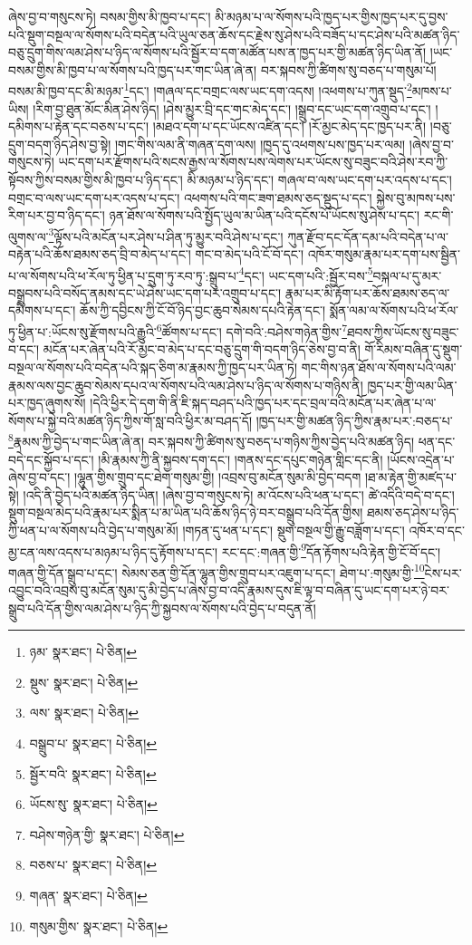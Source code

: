 ཞེས་བྱ་བ་གསུངས་ཏེ། བསམ་གྱིས་མི་ཁྱབ་པ་དང་། མི་མཉམ་པ་ལ་སོགས་པའི་ཁྱད་པར་གྱིས་ཁྱད་པར་དུ་བྱས་པའི་སྡུག་བསྔལ་ལ་སོགས་པའི་བདེན་པའི་ཡུལ་ཅན་ཆོས་དང་རྗེས་སུ་ཤེས་པའི་བཟོད་པ་དང་ཤེས་པའི་མཚན་ཉིད་བཅུ་དྲུག་གིས་ལམ་ཤེས་པ་ཉིད་ལ་སོགས་པའི་སྦྱོར་བ་དག་མཚོན་པས་ན་ཁྱད་པར་གྱི་མཚན་ཉིད་ཡིན་ནོ། །ཡང་བསམ་གྱིས་མི་ཁྱབ་པ་ལ་སོགས་པའི་ཁྱད་པར་གང་ཡིན་ཞེ་ན། བར་སྐབས་ཀྱི་ཚིགས་སུ་བཅད་པ་གསུམ་པོ། བསམ་མི་ཁྱབ་དང་མི་མཉམ་\footnote{ཉམ་  སྣར་ཐང་།  པེ་ཅིན། }དང་། །གཞལ་དང་བགྲང་ལས་ཡང་དག་འདས། །འཕགས་པ་ཀུན་སྡུད་\footnote{སྡུས་  སྣར་ཐང་།  པེ་ཅིན། }མཁས་པ་ཡིས། །རིག་བྱ་ཐུན་མོང་མིན་ཤེས་ཉིད། །ཤེས་མྱུར་བྲི་དང་གང་མེད་དང་། །སྒྲུབ་དང་ཡང་དག་འགྲུབ་པ་དང་། །དམིགས་པ་རྟེན་དང་བཅས་པ་དང་། །མཐའ་དག་པ་དང་ཡོངས་འཛིན་དང་། །རོ་མྱང་མེད་དང་ཁྱད་པར་ནི། །བཅུ་དྲུག་བདག་ཉིད་ཤེས་བྱ་སྟེ། །གང་གིས་ལམ་ནི་གཞན་དག་ལས། །ཁྱད་དུ་འཕགས་པས་ཁྱད་པར་ལམ། །ཞེས་བྱ་བ་གསུངས་ཏེ། ཡང་དག་པར་རྫོགས་པའི་སངས་རྒྱས་ལ་སོགས་པས་ལེགས་པར་ཡོངས་སུ་བཟུང་བའི་ཤེས་རབ་ཀྱི་སྟོབས་ཀྱིས་བསམ་གྱིས་མི་ཁྱབ་པ་ཉིད་དང་། མི་མཉམ་པ་ཉིད་དང་། གཞལ་བ་ལས་ཡང་དག་པར་འདས་པ་དང་། བགྲང་བ་ལས་ཡང་དག་པར་འདས་པ་དང་། འཕགས་པའི་གང་ཟག་ཐམས་ཅད་སྡུད་པ་དང་། སྐྱེས་བུ་མཁས་པས་རིག་པར་བྱ་བ་ཉིད་དང་། ཉན་ཐོས་ལ་སོགས་པའི་སྤྱོད་ཡུལ་མ་ཡིན་པའི་དངོས་པོ་ཡོངས་སུ་ཤེས་པ་དང་། རང་གི་ལུགས་ལ་\footnote{ལས་  སྣར་ཐང་།  པེ་ཅིན། }ལྟོས་པའི་མངོན་པར་ཤེས་པ་ཤིན་ཏུ་མྱུར་བའི་ཤེས་པ་དང་། ཀུན་རྫོབ་དང་དོན་དམ་པའི་བདེན་པ་ལ་བརྟེན་པའི་ཆོས་ཐམས་ཅད་བྲི་བ་མེད་པ་དང་། གང་བ་མེད་པའི་ངོ་བོ་དང་། འཁོར་གསུམ་རྣམ་པར་དག་པས་སྦྱིན་པ་ལ་སོགས་པའི་ཕ་རོལ་ཏུ་ཕྱིན་པ་དྲུག་ཏུ་རབ་ཏུ་:སྒྲུབ་པ་\footnote{བསྒྲུབ་པ་  སྣར་ཐང་།  པེ་ཅིན། }དང་། ཡང་དག་པའི་:སྦྱོར་བས་\footnote{སྦྱོར་བའི་  སྣར་ཐང་།  པེ་ཅིན། }བསྐལ་པ་དུ་མར་བསྒྲུབས་པའི་བསོད་ནམས་དང་ཡེ་ཤེས་ཡང་དག་པར་འགྲུབ་པ་དང་། རྣམ་པར་མི་རྟོག་པར་ཆོས་ཐམས་ཅད་ལ་དམིགས་པ་དང་། ཆོས་ཀྱི་དབྱིངས་ཀྱི་ངོ་བོ་ཉིད་བྱང་ཆུབ་སེམས་དཔའི་རྟེན་དང་། སྨོན་ལམ་ལ་སོགས་པའི་ཕ་རོལ་ཏུ་ཕྱིན་པ་:ཡོངས་སུ་རྫོགས་པའི་རྒྱུའི་\footnote{ཡོངས་སུ་  སྣར་ཐང་།  པེ་ཅིན། }ཚོགས་པ་དང་། དགེ་བའི་:བཤེས་གཉེན་གྱིས་\footnote{བཤེས་གཉེན་གྱི་  སྣར་ཐང་།  པེ་ཅིན། }ཐབས་ཀྱིས་ཡོངས་སུ་བཟུང་བ་དང་། མངོན་པར་ཞེན་པའི་རོ་མྱང་བ་མེད་པ་དང་བཅུ་དྲུག་གི་བདག་ཉིད་ཅེས་བྱ་བ་ནི། གོ་རིམས་བཞིན་དུ་སྡུག་བསྔལ་ལ་སོགས་པའི་བདེན་པའི་སྐད་ཅིག་མ་རྣམས་ཀྱི་ཁྱད་པར་ཡིན་ཏེ། གང་གིས་ཉན་ཐོས་ལ་སོགས་པའི་ལམ་རྣམས་ལས་བྱང་ཆུབ་སེམས་དཔའ་ལ་སོགས་པའི་ལམ་ཤེས་པ་ཉིད་ལ་སོགས་པ་གཉིས་ནི། ཁྱད་པར་གྱི་ལམ་ཡིན་པར་ཁྱད་ཞུགས་སོ། །དེའི་ཕྱིར་དེ་དག་གི་ནི་ཇི་སྐད་བཤད་པའི་ཁྱད་པར་དང་བྲལ་བའི་མངོན་པར་ཞེན་པ་ལ་སོགས་པ་སྐྱེ་བའི་མཚན་ཉིད་ཀྱིས་གོ་སླ་བའི་ཕྱིར་མ་བཤད་དོ། །ཁྱད་པར་གྱི་མཚན་ཉིད་ཀྱིས་རྣམ་པར་:བཅད་པ་\footnote{བཅས་པ་  སྣར་ཐང་།  པེ་ཅིན། }རྣམས་ཀྱི་བྱེད་པ་གང་ཡིན་ཞེ་ན། བར་སྐབས་ཀྱི་ཚིགས་སུ་བཅད་པ་གཉིས་ཀྱིས་བྱེད་པའི་མཚན་ཉིད། ཕན་དང་བདེ་དང་སྐྱོབ་པ་དང་། །མི་རྣམས་ཀྱི་ནི་སྐྱབས་དག་དང་། །གནས་དང་དཔུང་གཉེན་གླིང་དང་ནི། །ཡོངས་འདྲེན་པ་ཞེས་བྱ་བ་དང་། །ལྷུན་གྱིས་གྲུབ་དང་ཐེག་གསུམ་གྱི། །འབྲས་བུ་མངོན་སུམ་མི་བྱེད་བདག །ཐ་མ་རྟེན་གྱི་མཛད་པ་སྟེ། །འདི་ནི་བྱེད་པའི་མཚན་ཉིད་ཡིན། །ཞེས་བྱ་བ་གསུངས་ཏེ། མ་འོངས་པའི་ཕན་པ་དང་། ཚེ་འདིའི་བདེ་བ་དང་། སྡུག་བསྔལ་མེད་པའི་རྣམ་པར་སྨིན་པ་མ་ཡིན་པའི་ཆོས་ཉིད་ཉེ་བར་བསྒྲུབ་པའི་དོན་གྱིས། ཐམས་ཅད་ཤེས་པ་ཉིད་ཀྱི་ཕན་པ་ལ་སོགས་པའི་བྱེད་པ་གསུམ་མོ། །གཏན་དུ་ཕན་པ་དང་། སྡུག་བསྔལ་གྱི་རྒྱུ་བཟློག་པ་དང་། འཁོར་བ་དང་མྱ་ངན་ལས་འདས་པ་མཉམ་པ་ཉིད་དུ་རྟོགས་པ་དང་། རང་དང་:གཞན་གྱི་\footnote{གཞན་  སྣར་ཐང་།  པེ་ཅིན། }དོན་རྟོགས་པའི་རྟེན་གྱི་ངོ་བོ་དང་། གཞན་གྱི་དོན་སྒྲུབ་པ་དང་། སེམས་ཅན་གྱི་དོན་ལྷུན་གྱིས་གྲུབ་པར་འཇུག་པ་དང་། ཐེག་པ་:གསུམ་གྱི་\footnote{གསུམ་གྱིས་  སྣར་ཐང་།  པེ་ཅིན། }ངེས་པར་འབྱུང་བའི་འབྲས་བུ་མངོན་སུམ་དུ་མི་བྱེད་པ་ཞེས་བྱ་བ་འདི་རྣམས་དུས་ཇི་ལྟ་བ་བཞིན་དུ་ཡང་དག་པར་ཉེ་བར་སྒྲུབ་པའི་དོན་གྱིས་ལམ་ཤེས་པ་ཉིད་ཀྱི་སྐྱབས་ལ་སོགས་པའི་བྱེད་པ་བདུན་ནོ། 